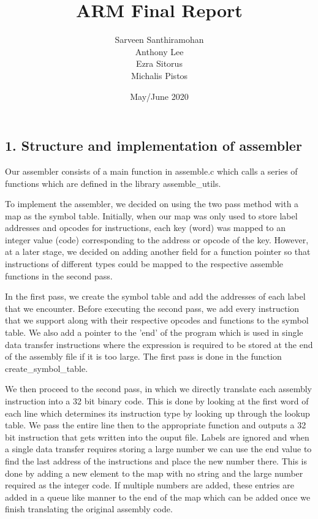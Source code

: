 \documentclass[a4paper]{article}
\title{ARM Final Report}
\author{Sarveen Santhiramohan \\ Anthony Lee\\ Ezra Sitorus\\ Michalis Pistos}
\date{May/June 2020}
\begin{document}
\maketitle

\subsection*{1. Structure and implementation of assembler}

Our assembler consists of a main function in assemble.c which calls a series of functions which
are defined in the library assemble_utils. 

To implement the assembler, we decided on using the two pass method with a map as the symbol table.
Initially, when our map was only used to store label addresses and opcodes for instructions, each
key (word) was mapped to an integer value (code) corresponding to the address or opcode of the key.
However, at a later stage, we decided on adding another field for a function pointer so that instructions
of different types could be mapped to the respective assemble functions in the second pass. 
\par
In the first pass, we create the symbol table and add the addresses of each label that we encounter.
Before executing the second pass, we add every instruction that we support along with their
respective opcodes and functions to the symbol table. We also add a pointer to the 'end' of the program
which is used in single data transfer instructions where the expression is required to be stored at the 
end of the assembly file if it is too large. The first pass is done in the function create_symbol_table.
\par
We then proceed to the second pass, in which we directly translate each assembly instruction into a 32 bit binary code.
This is done by looking at the first word of each line which determines its instruction type by looking up through the 
lookup table. We pass the entire line then to the appropriate function and outputs a 32 bit instruction that gets written 
into the ouput file. Labels are ignored and when a single data transfer requires storing a large number we can use the end value 
to find the last address of the instructions and place the new number there. This is done by adding a new element
to the map with no string and the large number required as the integer code. If multiple numbers are added,
these entries are added in a queue like manner to the end of the map which can be added once we finish 
translating the original assembly code.
\end{document}
